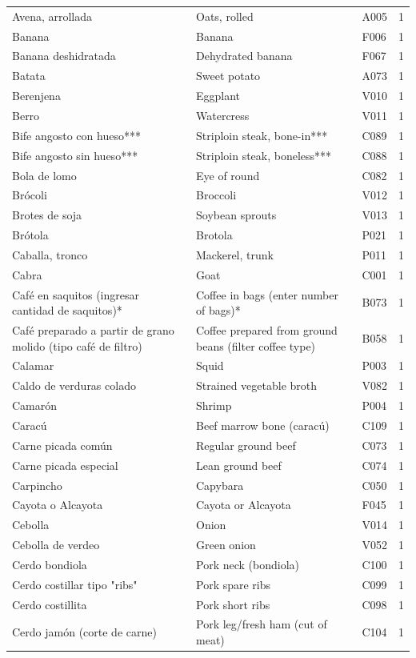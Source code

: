 {\begin{longtable}{p{4.3cm}p{5.5cm}p{1.5cm}p{0.7cm}}
Avena, arrollada & Oats, rolled & A005 & 1\\
Banana & Banana & F006 & 1\\
Banana deshidratada & Dehydrated banana & F067 & 1\\
Batata & Sweet potato & A073 & 1\\
Berenjena & Eggplant & V010 & 1\\
Berro & Watercress & V011 & 1\\
Bife angosto con hueso*** & Striploin steak, bone-in*** & C089 & 1\\
Bife angosto sin hueso*** & Striploin steak, boneless*** & C088 & 1\\
Bola de lomo & Eye of round & C082 & 1\\
Brócoli & Broccoli & V012 & 1\\
Brotes de soja & Soybean sprouts & V013 & 1\\
Brótola & Brotola & P021 & 1\\
Caballa, tronco & Mackerel, trunk & P011 & 1\\
Cabra & Goat & C001 & 1\\
Café en saquitos (ingresar cantidad de saquitos)* & Coffee in bags (enter number of bags)* & B073 & 1\\
Café preparado a partir de grano molido (tipo café de filtro) & Coffee prepared from ground beans (filter coffee type) & B058 & 1\\
Calamar & Squid & P003 & 1\\
Caldo de verduras colado & Strained vegetable broth & V082 & 1\\
Camarón & Shrimp & P004 & 1\\
Caracú & Beef marrow bone (caracú) & C109 & 1\\
Carne picada común & Regular ground beef & C073 & 1\\
Carne picada especial & Lean ground beef & C074 & 1\\
Carpincho & Capybara & C050 & 1\\
Cayota o Alcayota & Cayota or Alcayota & F045 & 1\\
Cebolla & Onion & V014 & 1\\
Cebolla de verdeo & Green onion & V052 & 1\\
Cerdo bondiola & Pork neck (bondiola) & C100 & 1\\
Cerdo costillar tipo "ribs" & Pork spare ribs & C099 & 1\\
Cerdo costillita & Pork short ribs & C098 & 1\\
Cerdo jamón (corte de carne) & Pork leg/fresh ham (cut of meat) & C104 & 1\\

\end{longtable}}
